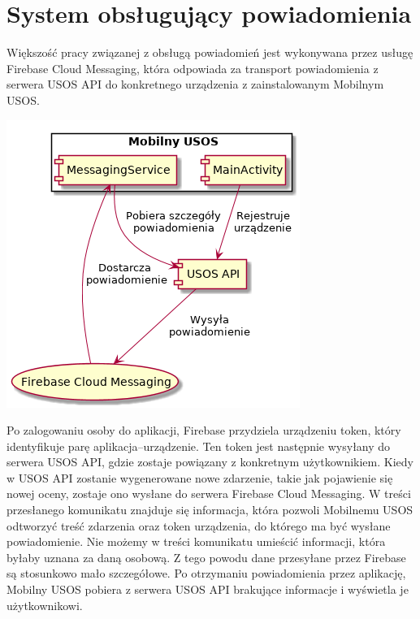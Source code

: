 \documentclass{pracamgr}
\begin{document}
\section{System obsługujący powiadomienia}

Większość pracy związanej z obsługą powiadomień jest wykonywana przez usługę
Firebase Cloud Messaging, która odpowiada za transport powiadomienia z serwera
USOS API do konkretnego urządzenia z zainstalowanym Mobilnym USOS.

\begingroup
\centering
\includegraphics[scale=0.5]{img/messages.png}
\label{fig:messages}
\medskip
\endgroup

Po zalogowaniu osoby do aplikacji, Firebase przydziela urządzeniu token, który
identyfikuje parę aplikacja--urządzenie. Ten token jest następnie wysyłany do
serwera USOS API, gdzie zostaje powiązany z konkretnym użytkownikiem. Kiedy w USOS
API zostanie wygenerowane nowe zdarzenie, takie jak pojawienie się nowej oceny,
zostaje ono wysłane do serwera Firebase Cloud Messaging. W treści przesłanego
komunikatu znajduje się informacja, która pozwoli Mobilnemu USOS odtworzyć treść
zdarzenia oraz token urządzenia, do którego ma być wysłane powiadomienie. Nie
możemy w treści komunikatu umieścić informacji, która byłaby uznana za daną osobową.
Z tego powodu dane przesyłane przez Firebase są stosunkowo mało szczegółowe. Po
otrzymaniu powiadomienia przez aplikację, Mobilny USOS pobiera z serwera USOS API
brakujące informacje i wyświetla je użytkownikowi.
\end{document}
